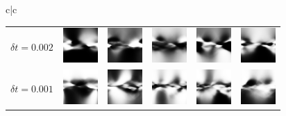 \begin{figure}[!ht]
\begin{tabular}{c|c}
\begin{tabular}{l|lllll}
			$\delta t = 0.002$ &\includegraphics[width=\iw]{figs_data/pendulum/0.002/ddpg_act_10.png} &\includegraphics[width=\iw]{figs_data/pendulum/0.002/ddpg_act_20.png} &\includegraphics[width=\iw]{figs_data/pendulum/0.002/ddpg_act_30.png} &\includegraphics[width=\iw]{figs_data/pendulum/0.002/ddpg_act_40.png} &\includegraphics[width=\iw]{figs_data/pendulum/0.002/ddpg_act_50.png} \\
			$\delta t = 0.001$ &\includegraphics[width=\iw]{figs_data/pendulum/0.001/ddpg_act_20.png} &\includegraphics[width=\iw]{figs_data/pendulum/0.001/ddpg_act_40.png} &\includegraphics[width=\iw]{figs_data/pendulum/0.001/ddpg_act_60.png} &\includegraphics[width=\iw]{figs_data/pendulum/0.001/ddpg_act_80.png} &\includegraphics[width=\iw]{figs_data/pendulum/0.001/ddpg_act_100.png} \\

\end{tabular}
\end{tabular}
\end{figure}
